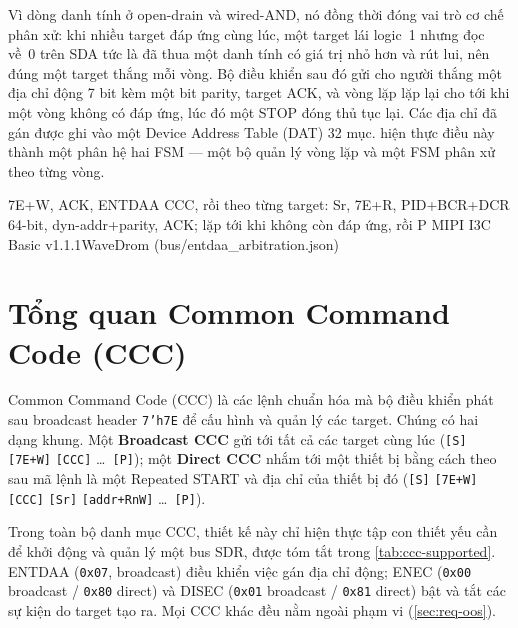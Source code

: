 Vì dòng danh tính ở open-drain và wired-AND, nó đồng thời đóng vai trò cơ chế phân xử: khi nhiều
target đáp ứng cùng lúc, một target lái logic~1 nhưng đọc về~0 trên SDA tức là đã thua một danh
tính có giá trị nhỏ hơn và rút lui, nên đúng một target thắng mỗi vòng. Bộ điều khiển sau đó gửi
cho người thắng một địa chỉ động 7 bit kèm một bit parity, target ACK, và vòng lặp lặp lại cho
tới khi một vòng không có đáp ứng, lúc đó một STOP đóng thủ tục lại. Các địa chỉ đã gán được ghi
vào một Device Address Table (DAT) 32 mục.  hiện thực điều này thành
một phân hệ hai FSM --- một bộ quản lý vòng lặp và một FSM phân xử theo từng vòng.

  {7E+W, ACK, ENTDAA CCC, rồi theo từng target: Sr, 7E+R, PID+BCR+DCR 64-bit, dyn-addr+parity,
   ACK; lặp tới khi không còn đáp ứng, rồi P}
  {MIPI I3C Basic v1.1.1}{WaveDrom (bus/entdaa_arbitration.json)}

\section{Tổng quan Common Command Code (CCC)}
\label{sec:bg-ccc}

Common Command Code (CCC) là các lệnh chuẩn hóa mà bộ điều khiển phát sau broadcast header
\texttt{7'h7E} để cấu hình và quản lý các target. Chúng có hai dạng khung. Một \textbf{Broadcast
CCC} gửi tới tất cả các target cùng lúc (\texttt{[S]} \texttt{[7E+W]} \texttt{[CCC]} \dots\
\texttt{[P]}); một \textbf{Direct CCC} nhắm tới một thiết bị bằng cách theo sau mã lệnh là một
Repeated START và địa chỉ của thiết bị đó (\texttt{[S]} \texttt{[7E+W]} \texttt{[CCC]}
\texttt{[Sr]} \texttt{[addr+RnW]} \dots\ \texttt{[P]}).

Trong toàn bộ danh mục CCC, thiết kế này chỉ hiện thực tập con thiết yếu cần để khởi động và
quản lý một bus SDR, được tóm tắt trong \cref{tab:ccc-supported}. ENTDAA (\texttt{0x07},
broadcast) điều khiển việc gán địa chỉ động; ENEC (\texttt{0x00} broadcast / \texttt{0x80}
direct) và DISEC (\texttt{0x01} broadcast / \texttt{0x81} direct) bật và tắt các sự kiện do
target tạo ra. Mọi CCC khác đều nằm ngoài phạm vi (\cref{sec:req-oos}).

